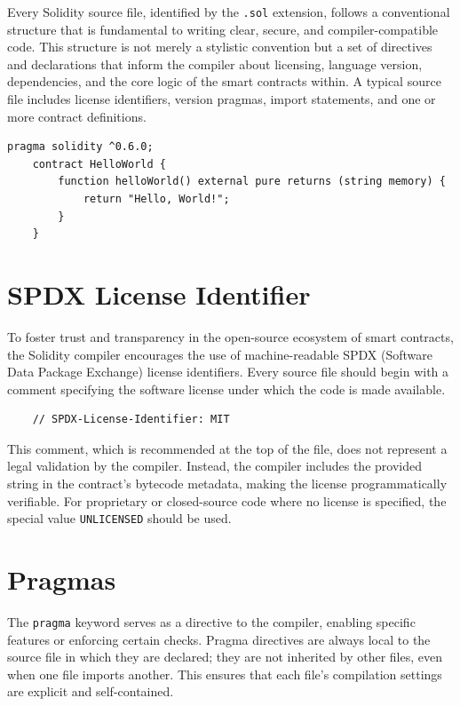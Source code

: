 \documentclass{scrbook}
\begin{document}
Every Solidity source file, identified by the \texttt{.sol} extension, follows a conventional structure that is fundamental to writing clear, secure, and compiler-compatible code. This structure is not merely a stylistic convention but a set of directives and declarations that inform the compiler about licensing, language version, dependencies, and the core logic of the smart contracts within. A typical source file includes license identifiers, version pragmas, import statements, and one or more contract definitions.

\begin{lstlisting}[caption={Simple contract with one function that returns the "Hello, World!" string when called}]
    pragma solidity ^0.6.0;
    contract HelloWorld {
        function helloWorld() external pure returns (string memory) {
            return "Hello, World!";
        }
    }
\end{lstlisting}

\section{SPDX License Identifier}

To foster trust and transparency in the open-source ecosystem of smart contracts, the Solidity compiler encourages the use of machine-readable SPDX (Software Data Package Exchange) license identifiers. Every source file should begin with a comment specifying the software license under which the code is made available.

\begin{lstlisting}
    // SPDX-License-Identifier: MIT
\end{lstlisting}

This comment, which is recommended at the top of the file, does not represent a legal validation by the compiler. Instead, the compiler includes the provided string in the contract's bytecode metadata, making the license programmatically verifiable. For proprietary or closed-source code where no license is specified, the special value \texttt{UNLICENSED} should be used.

\section{Pragmas}

The \texttt{pragma} keyword serves as a directive to the compiler, enabling specific features or enforcing certain checks. Pragma directives are always local to the source file in which they are declared; they are not inherited by other files, even when one file imports another. This ensures that each file's compilation settings are explicit and self-contained.
\end{document}
